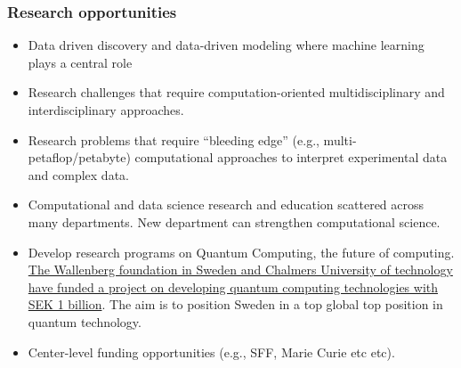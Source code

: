\documentclass{beamer}
\begin{document}
\begin{frame}
\frametitle{Research opportunities}

\begin{itemize}
\item Data driven discovery and data-driven modeling where machine learning plays a central role

\item Research challenges that require computation-oriented multidisciplinary and interdisciplinary approaches.	

\item Research problems that require “bleeding edge” (e.g., multi-petaflop/petabyte) computational approaches to interpret experimental data and complex data.

\item Computational and data science research and education scattered across many departments. New department can strengthen computational science. 	

\item Develop research programs on Quantum Computing, the future of computing.  \href{{https://www.chalmers.se/en/news/Pages/Engineering-of-a-Swedish-quantum-computer-set-to-start.aspx}}{The Wallenberg foundation in Sweden and Chalmers University of technology have funded a project on developing quantum computing technologies with SEK 1 billion}. The aim is to position  Sweden in  a top global top position in quantum technology. 

\item Center-level funding opportunities (e.g., SFF, Marie Curie etc etc).	
\end{itemize}

\noindent
\end{frame}
\end{document}
